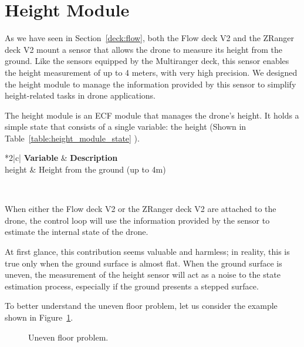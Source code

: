 \section{Height Module}\label{sec:module_height}

As we have seen in Section~\ref{deck:flow}, both the Flow deck V2 and the ZRanger deck V2 mount a sensor that allows the drone to measure its height from the ground.
Like the sensors equipped by the Multiranger deck, this sensor enables the height measurement of up to 4 meters, with very high precision.
We designed the height module to manage the information provided by this sensor to simplify height-related tasks in drone applications.

The height module is an ECF module that manages the drone's height. It holds a simple state that consists of a single variable: the height (Shown in Table~\ref{table:height_module_state} ).
\begin{table}[tb]
    \centering
    \begin{tabular}{*{2}{|c}|}
    \hline
    \textbf{Variable} & \textbf{Description} \\
    \hline \hline
    height & Height from the ground (up to 4m) \\
    \hline
    \end{tabular}
    \\[10pt]
    \caption{ECF Height Module's state.}\label{table:height_module_state}
\end{table}

When either the Flow deck V2 or the ZRanger deck V2 are attached to the drone, the control loop will use the information provided by the sensor to estimate the internal state of the drone.

At first glance, this contribution seems valuable and harmless; in reality, this is true only when the ground surface is almost flat.
When the ground surface is uneven, the measurement of the height sensor will act as a noise to the state estimation process, especially if the ground presents a stepped surface.

To better understand the uneven floor problem, let us consider the example shown in Figure~\ref{fig:uneven_floor}.

\begin{figure}[tb]
    \centering
    \quad
    \quad
    \caption{Uneven floor problem.}\label{fig:uneven_floor}
\end{figure}

